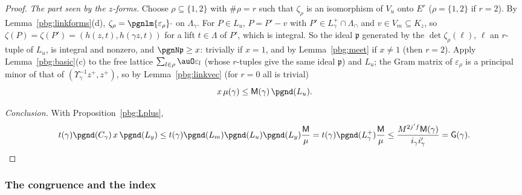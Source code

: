 \documentclass[10pt]{amsart}
\theoremstyle{definition}
\theoremstyle{remark}
\begin{document}
\begin{proof}
\emph{The part seen by the $z$-forms.} Choose $\rho\subseteq\{1,2\}$ with $\#\rho=r$ such that
$\zeta_\rho$ is an isomorphism of $V_u$ onto $E^r$ ($\rho=\{1,2\}$ if $r=2$). By
Lemma~\ref{pbg:linkforms}(d), $\zeta_\rho=\pgnlm{\varepsilon_\rho}\cdot$ on $\Lambda_\gamma$. For $P\in
L_u$, $P=P'-v$ with $P'\in L^+_\gamma\cap\Lambda_\cap$ and $v\in V_m\subseteq K_z$, so $\zeta(P)=
\zeta(P')=(h(z,t),h(\gamma z,t))$ for a lift $t\in\Lambda$ of $P'$, which is integral. So the ideal
$\mathfrak p$ generated by the $\det\zeta_\rho(\ell)$, $\ell$ an $r$-tuple of $L_u$, is integral and
nonzero, and $\pgnN\mathfrak p\ge x$: trivially if $x=1$, and by Lemma~\ref{pbg:meet} if $x\ne1$ (then
$r=2$). Apply Lemma~\ref{pbg:basic}(c) to the free lattice $\sum_{l\in\rho}\auO\varepsilon_l$ (whose
$r$-tuples give the same ideal $\mathfrak p$) and $L_u$; the Gram matrix of $\varepsilon_\rho$ is a
principal minor of that of $(\Upsilon_\gamma^{-1}z^+,z^+)$, so by Lemma~\ref{pbg:linkvec} (for $r=0$ all
is trivial)
\[
x\,\mu(\gamma)\le\mathsf M(\gamma)\,\pgnd(L_u).
\]

\emph{Conclusion.} With Proposition~\ref{pbg:Lplus},
\[
t(\gamma)\pgnd(C_\gamma)\,x\,\pgnd(L_y)\le t(\gamma)\pgnd(L_m)\pgnd(L_u)\pgnd(L_y)\frac{\mathsf M}{\mu}=
t(\gamma)\pgnd(L^+_\gamma)\frac{\mathsf M}{\mu}\le\frac{M^{2j'f}\mathsf M(\gamma)}{i_\gamma i'_\gamma}=
\mathsf G(\gamma). \qedhere
\]
\end{proof}

\subsubsection{The congruence and the index}\label{pbg:ss-congr}
\end{document}
